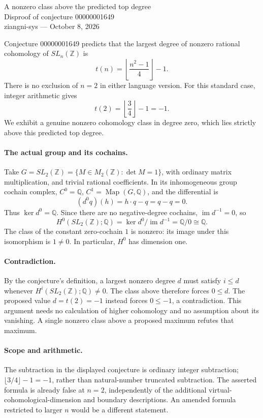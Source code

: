 \documentclass[11pt]{article}
\begin{document}
\begin{center}{\Large A nonzero class above the predicted top degree}\\[4pt]
Disproof of conjecture 00000001649\\[4pt]
ziangni-sys --- October 8, 2026\end{center}

Conjecture 00000001649 predicts that the largest degree of nonzero rational
cohomology of $SL_n(\mathbb Z)$ is
\[
 t(n)=\left\lfloor\frac{n^2-1}{4}\right\rfloor-1.
\]
There is no exclusion of $n=2$ in either language version. For this standard
case, integer arithmetic gives
\[
 t(2)=\left\lfloor\frac34\right\rfloor-1=-1.
\]
We exhibit a genuine nonzero cohomology class in degree zero, which lies
strictly above this predicted top degree.

\paragraph{The actual group and its cochains.}
Take
$G=SL_2(\mathbb Z)=\{M\in M_2(\mathbb Z):\det M=1\}$, with ordinary matrix
multiplication, and trivial rational coefficients. In its inhomogeneous
group cochain complex, $C^0=\mathbb Q$, $C^1=\operatorname{Map}(G,\mathbb Q)$,
and the differential is
\[
 (d^0q)(h)=h\cdot q-q=q-q=0.
\]
Thus $\ker d^0=\mathbb Q$. Since there are no negative-degree cochains,
$\operatorname{im}d^{-1}=0$, so
\[
 H^0(SL_2(\mathbb Z);\mathbb Q)
 =\ker d^0/\operatorname{im}d^{-1}
 =\mathbb Q/0\cong\mathbb Q.
\]
The class of the constant zero-cochain $1$ is nonzero: its image under this
isomorphism is $1\ne0$. In particular, $H^0$ has dimension one.

\paragraph{Contradiction.}
By the conjecture's definition, a largest nonzero degree $d$ must satisfy
$i\le d$ whenever $H^i(SL_2(\mathbb Z);\mathbb Q)\ne0$. The class above
therefore forces $0\le d$. The proposed value $d=t(2)=-1$ instead forces
$0\le-1$, a contradiction. This argument needs no calculation of higher
cohomology and no assumption about its vanishing. A single nonzero class
above a proposed maximum refutes that maximum.

\paragraph{Scope and arithmetic.}
The subtraction in the displayed conjecture is ordinary integer
subtraction; $\lfloor3/4\rfloor-1=-1$, rather than natural-number truncated
subtraction. The asserted formula is already false at $n=2$, independently
of the additional virtual-cohomological-dimension and boundary descriptions.
An amended formula restricted to larger $n$ would be a different statement.
\end{document}
